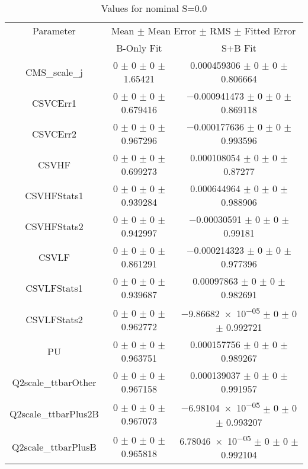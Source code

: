 \begin{table}
\centering
\caption{Values for nominal S=0.0}
\begin{tabular}{ccc}
\toprule
Parameter & \multicolumn{2}{c}{Mean $\pm$ Mean Error $\pm$ RMS $\pm$ Fitted Error}\\
 & B-Only Fit & S+B Fit\\
\midrule
CMS\_scale\_j & \num{0} $\pm$ \num{0} $\pm$ \num{0} $\pm$ \num{1.65421} & \num{0.000459306} $\pm$ \num{0} $\pm$ \num{0} $\pm$ \num{0.806664}\\
CSVCErr1 & \num{0} $\pm$ \num{0} $\pm$ \num{0} $\pm$ \num{0.679416} & \num{-0.000941473} $\pm$ \num{0} $\pm$ \num{0} $\pm$ \num{0.869118}\\
CSVCErr2 & \num{0} $\pm$ \num{0} $\pm$ \num{0} $\pm$ \num{0.967296} & \num{-0.000177636} $\pm$ \num{0} $\pm$ \num{0} $\pm$ \num{0.993596}\\
CSVHF & \num{0} $\pm$ \num{0} $\pm$ \num{0} $\pm$ \num{0.699273} & \num{0.000108054} $\pm$ \num{0} $\pm$ \num{0} $\pm$ \num{0.87277}\\
CSVHFStats1 & \num{0} $\pm$ \num{0} $\pm$ \num{0} $\pm$ \num{0.939284} & \num{0.000644964} $\pm$ \num{0} $\pm$ \num{0} $\pm$ \num{0.988906}\\
CSVHFStats2 & \num{0} $\pm$ \num{0} $\pm$ \num{0} $\pm$ \num{0.942997} & \num{-0.00030591} $\pm$ \num{0} $\pm$ \num{0} $\pm$ \num{0.99181}\\
CSVLF & \num{0} $\pm$ \num{0} $\pm$ \num{0} $\pm$ \num{0.861291} & \num{-0.000214323} $\pm$ \num{0} $\pm$ \num{0} $\pm$ \num{0.977396}\\
CSVLFStats1 & \num{0} $\pm$ \num{0} $\pm$ \num{0} $\pm$ \num{0.939687} & \num{0.00097863} $\pm$ \num{0} $\pm$ \num{0} $\pm$ \num{0.982691}\\
CSVLFStats2 & \num{0} $\pm$ \num{0} $\pm$ \num{0} $\pm$ \num{0.962772} & \num{-9.86682e-05} $\pm$ \num{0} $\pm$ \num{0} $\pm$ \num{0.992721}\\
PU & \num{0} $\pm$ \num{0} $\pm$ \num{0} $\pm$ \num{0.963751} & \num{0.000157756} $\pm$ \num{0} $\pm$ \num{0} $\pm$ \num{0.989267}\\
Q2scale\_ttbarOther & \num{0} $\pm$ \num{0} $\pm$ \num{0} $\pm$ \num{0.967158} & \num{0.000139037} $\pm$ \num{0} $\pm$ \num{0} $\pm$ \num{0.991957}\\
Q2scale\_ttbarPlus2B & \num{0} $\pm$ \num{0} $\pm$ \num{0} $\pm$ \num{0.967073} & \num{-6.98104e-05} $\pm$ \num{0} $\pm$ \num{0} $\pm$ \num{0.993207}\\
Q2scale\_ttbarPlusB & \num{0} $\pm$ \num{0} $\pm$ \num{0} $\pm$ \num{0.965818} & \num{6.78046e-05} $\pm$ \num{0} $\pm$ \num{0} $\pm$ \num{0.992104}\\

\end{tabular}
\end{table}
